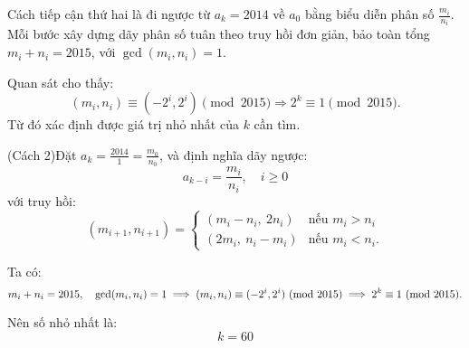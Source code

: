 \documentclass[../05-modular-arithmetic-a.tex]{subfiles}
\begin{document}
\newpage

\begin{story*}
    Cách tiếp cận thứ hai là đi ngược từ \( a_k = 2014 \) về \( a_0 \) bằng biểu diễn phân số \( \frac{m_i}{n_i} \).  
    Mỗi bước xây dựng dãy phân số tuân theo truy hồi đơn giản, bảo toàn tổng \( m_i + n_i = 2015 \), với \( \gcd(m_i, n_i) = 1 \).  

    Quan sát cho thấy:
    \[
        (m_i, n_i) \equiv (-2^i, 2^i) \pmod{2015}
        \Rightarrow 2^k \equiv 1 \pmod{2015}.
    \]
    Từ đó xác định được giá trị nhỏ nhất của \( k \) cần tìm.
\end{story*}

\begin{soln}(Cách 2)\footnotemark[\value{footnote}]
	Đặt \( a_k = \frac{2014}{1} = \frac{m_0}{n_0} \), và định nghĩa dãy ngược:
	\[
		a_{k-i} = \frac{m_i}{n_i}, \quad i \ge 0
	\]
	với truy hồi:
	\[
		(m_{i+1}, n_{i+1}) =
		\begin{cases}
			(m_i - n_i,\ 2n_i) & \text{nếu } m_i > n_i \\
			(2m_i,\ n_i - m_i) & \text{nếu } m_i < n_i.
		\end{cases}
	\]

	Ta có:
	\[
		m_i + n_i = 2015,\quad \gcd(m_i, n_i) = 1
	\implies (m_i, n_i) \equiv (-2^i, 2^i) \ (\mathrm{mod}\ 2015)
	\implies 2^k \equiv 1 \ (\mathrm{mod}\ 2015).
	\]

	Nên số nhỏ nhất là:
	\[
		\boxed{k = 60}
	\]
\end{soln}

\end{document}
